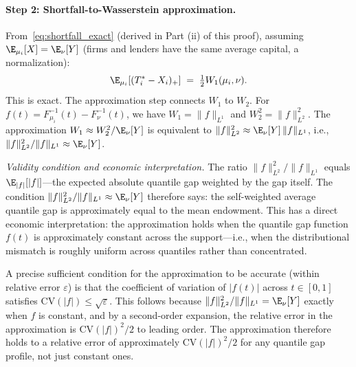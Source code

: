 \paragraph{Step 2: Shortfall-to-Wasserstein approximation.}

From~\eqref{eq:shortfall_exact} (derived in Part (ii) of this proof), assuming $\E_{\mu_i}[X] = \E_\nu[Y]$ (firms and lenders have the same average capital, a normalization):
\[
  \E_{\mu_i}[(T_i^*-X_i)_+] \;=\; \tfrac{1}{2}W_1(\mu_i,\nu).
\]
This is exact. The approximation step connects $W_1$ to $W_2$. For $f(t) = F_{\mu_i}^{-1}(t)-F_\nu^{-1}(t)$, we have $W_1 = \|f\|_{L^1}$ and $W_2^2 = \|f\|_{L^2}^2$. The approximation $W_1 \approx W_2^2/\E_\nu[Y]$ is equivalent to $\|f\|_{L^2}^2 \approx \E_\nu[Y]\,\|f\|_{L^1}$, i.e., $\|f\|_{L^2}^2/\|f\|_{L^1} \approx \E_\nu[Y]$.

\emph{Validity condition and economic interpretation.} The ratio $\|f\|_{L^2}^2/\|f\|_{L^1}$ equals $\E_{|f|}[|f|]$---the expected absolute quantile gap weighted by the gap itself. The condition $\|f\|_{L^2}^2/\|f\|_{L^1} \approx \E_\nu[Y]$ therefore says: the self-weighted average quantile gap is approximately equal to the mean endowment. This has a direct economic interpretation: the approximation holds when the quantile gap function $f(t)$ is approximately constant across the support---i.e., when the distributional mismatch is roughly uniform across quantiles rather than concentrated.

A precise sufficient condition for the approximation to be accurate (within relative error $\varepsilon$) is that the coefficient of variation of $|f(t)|$ across $t \in [0,1]$ satisfies $\mathrm{CV}(|f|) \leq \sqrt{\varepsilon}$. This follows because $\|f\|_{L^2}^2/\|f\|_{L^1} = \E_\nu[Y]$ exactly when $f$ is constant, and by a second-order expansion, the relative error in the approximation is $\mathrm{CV}(|f|)^2/2$ to leading order. The approximation therefore holds to a relative error of approximately $\mathrm{CV}(|f|)^2/2$ for any quantile gap profile, not just constant ones.

